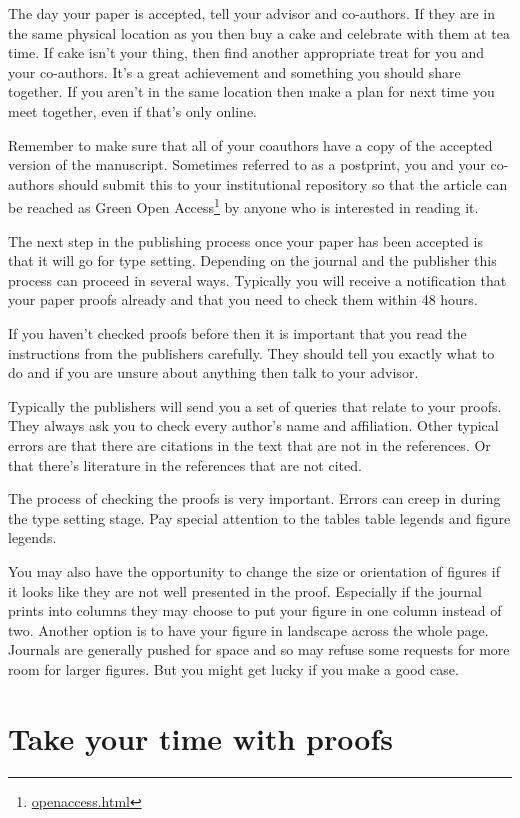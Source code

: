 \documentclass[
]{krantz}
\renewcommand{\href}[2]{#2\footnote{\url{#1}}}
\begin{document}
The day your paper is accepted, tell your advisor and co-authors. If they are in the same physical location as you then buy a cake and celebrate with them at tea time. If cake isn't your thing, then find another appropriate treat for you and your co-authors. It's a great achievement and something you should share together. If you aren't in the same location then make a plan for next time you meet together, even if that's only online.

Remember to make sure that all of your coauthors have a copy of the accepted version of the manuscript. Sometimes referred to as a postprint, you and your co-authors should submit this to your institutional repository so that the article can be reached as \href{openaccess.html}{Green Open Access} by anyone who is interested in reading it.

The next step in the publishing process once your paper has been accepted is that it will go for type setting. Depending on the journal and the publisher this process can proceed in several ways. Typically you will receive a notification that your paper proofs already and that you need to check them within 48 hours.

If you haven't checked proofs before then it is important that you read the instructions from the publishers carefully. They should tell you exactly what to do and if you are unsure about anything then talk to your advisor.

Typically the publishers will send you a set of queries that relate to your proofs. They always ask you to check every author's name and affiliation. Other typical errors are that there are citations in the text that are not in the references. Or that there's literature in the references that are not cited.

The process of checking the proofs is very important. Errors can creep in during the type setting stage. Pay special attention to the tables table legends and figure legends.

You may also have the opportunity to change the size or orientation of figures if it looks like they are not well presented in the proof. Especially if the journal prints into columns they may choose to put your figure in one column instead of two. Another option is to have your figure in landscape across the whole page. Journals are generally pushed for space and so may refuse some requests for more room for larger figures. But you might get lucky if you make a good case.

\hypertarget{take-your-time-with-proofs}{%
\section{Take your time with proofs}\label{take-your-time-with-proofs}}
\end{document}
